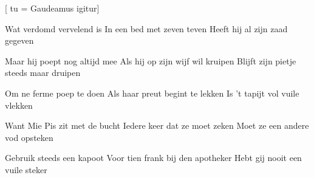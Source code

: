  [
tu = {Gaudeamus igitur}]

\beginverse
{} {Wat verdomd vervelend is}
In een bed met zeven teven
Heeft hij al zijn zaad gegeven
\endverse

\beginverse
{} {Maar hij poept nog altijd mee}
Als hij op zijn wijf wil kruipen
Blijft zijn pietje steeds maar druipen
\endverse

\beginverse
{} {Om ne ferme poep te doen}
Als haar preut begint te lekken
Is 't tapijt vol vuile vlekken
\endverse

\beginverse
{} {Want Mie Pis zit met de bucht}
Iedere keer dat ze moet zeken
Moet ze een andere vod opsteken
\endverse

\beginverse
{} {Gebruik steeds een kapoot}
Voor tien frank bij den apotheker
Hebt gij nooit een vuile steker
\endverse

\endsong
